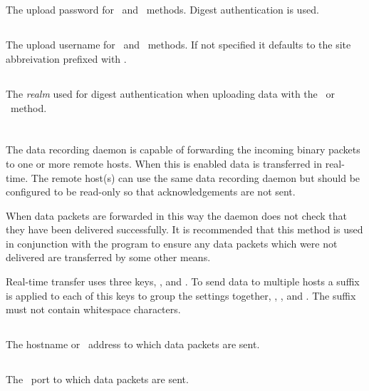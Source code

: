 \subsection{}
The upload password for \http\ and \https\ methods. Digest
authentication is used.

\subsection{}
The upload username for \http\ and \https\ methods. If not specified
it defaults to the site abbreivation prefixed with .

\subsection{}
The \emph{realm} used for digest authentication when uploading data
with the \http\ or \https\ method.

\section{}

The data recording daemon is capable of forwarding the incoming binary
packets to one or more remote hosts. When this is enabled data is
transferred in real-time. The remote host(s) can use the same data
recording daemon but should be configured to be read-only so that
acknowledgements are not sent.

When data packets are forwarded in this way the daemon does not check
that they have been delivered successfully. It is recommended that
this method is used in conjunction with the 
program to ensure any data packets which were not delivered are
transferred by some other means.

Real-time transfer uses three keys, ,
 and . To send data to multiple
hosts a suffix is applied to each of this keys to group the settings
together, \eg, ,  and
. The suffix must not contain whitespace characters.

\subsection{}
The hostname or \ip\ address to which data packets are sent.

\subsection{}
The \udp\ port to which data packets are sent.

